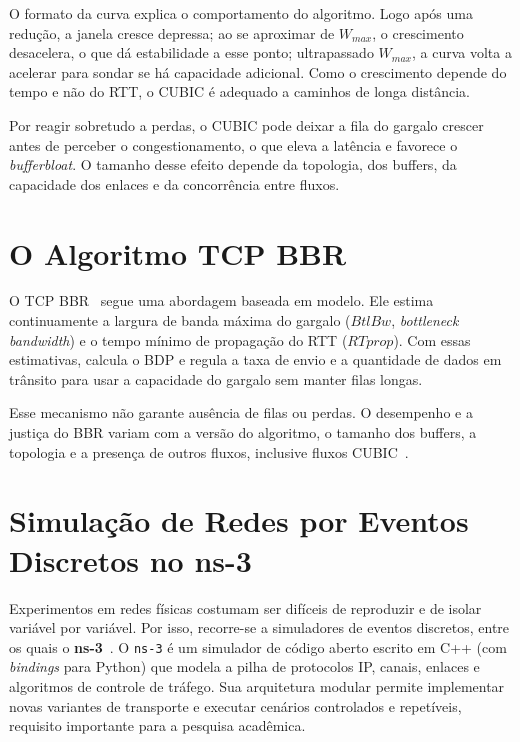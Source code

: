 O formato da curva explica o comportamento do algoritmo. Logo após uma redução, a janela cresce depressa; ao se aproximar de $W_{max}$, o crescimento desacelera, o que dá estabilidade a esse ponto; ultrapassado $W_{max}$, a curva volta a acelerar para sondar se há capacidade adicional. Como o crescimento depende do tempo e não do RTT, o CUBIC é adequado a caminhos de longa distância.

Por reagir sobretudo a perdas, o CUBIC pode deixar a fila do gargalo crescer antes de perceber o congestionamento, o que eleva a latência e favorece o \textit{bufferbloat}. O tamanho desse efeito depende da topologia, dos buffers, da capacidade dos enlaces e da concorrência entre fluxos.

\section{O Algoritmo TCP BBR}
O TCP BBR~\cite{cardwell2017} segue uma abordagem baseada em modelo. Ele estima continuamente a largura de banda máxima do gargalo ($BtlBw$, \textit{bottleneck bandwidth}) e o tempo mínimo de propagação do RTT ($RTprop$). Com essas estimativas, calcula o BDP e regula a taxa de envio e a quantidade de dados em trânsito para usar a capacidade do gargalo sem manter filas longas.

Esse mecanismo não garante ausência de filas ou perdas. O desempenho e a justiça do BBR variam com a versão do algoritmo, o tamanho dos buffers, a topologia e a presença de outros fluxos, inclusive fluxos CUBIC~\cite{ware2019,casas2022}.

\section{Simulação de Redes por Eventos Discretos no ns-3}
Experimentos em redes físicas costumam ser difíceis de reproduzir e de isolar variável por variável. Por isso, recorre-se a simuladores de eventos discretos, entre os quais o \textbf{ns-3}~\cite{ns3}. O \texttt{ns-3} é um simulador de código aberto escrito em C++ (com \textit{bindings} para Python) que modela a pilha de protocolos IP, canais, enlaces e algoritmos de controle de tráfego. Sua arquitetura modular permite implementar novas variantes de transporte e executar cenários controlados e repetíveis, requisito importante para a pesquisa acadêmica.

